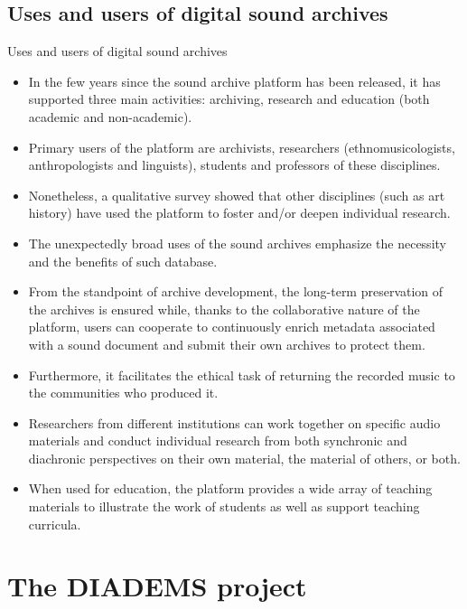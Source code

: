 \documentclass[final, hyperref, table]{beamer}
\begin{document}
\subsection{Uses and users of digital sound archives}
\begin{frame}{Uses and users of digital sound archives}
  \begin{itemize}

  \item In the few years since the sound archive platform has been
    released, it has supported three main activities: archiving,
    research and education (both academic and non-academic).
  \item Primary
    users of the platform are archivists, researchers
    (ethnomusicologists, anthropologists and linguists), students and
    professors of these disciplines.
  \item Nonetheless, a qualitative survey
    showed that other disciplines (such as art history) have used the
    platform to foster and/or deepen individual research.
  \item The unexpectedly broad uses of the sound archives emphasize the
    necessity and the benefits of such database.
  \item From the standpoint
    of archive development, the long-term preservation of the archives
    is ensured while, thanks to the collaborative nature of the
    platform, users can cooperate to continuously enrich metadata
    associated with a sound document and submit their own archives to
    protect them.
  \item Furthermore, it facilitates the ethical task of
    returning the recorded music to the communities who produced it.

  \item Researchers from different institutions can work together on
    specific audio materials and conduct individual research from both
    synchronic and diachronic perspectives on their own material, the
    material of others, or both.
  \item When used for education, the
    platform provides a wide array of teaching materials to illustrate
    the work of students as well as support teaching curricula.
  \end{itemize}
\end{frame}
\section[The DIADEMS project]{The DIADEMS project}\label{sec:Diadems}
\end{document}
